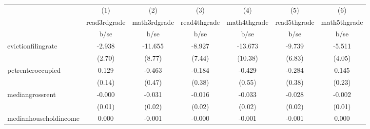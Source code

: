 {
\def\sym#1{\ifmmode^{#1}\else\(^{#1}\)\fi}
\begin{tabular}{l*{6}{c}}
\hline\hline
            &\multicolumn{1}{c}{(1)}           &\multicolumn{1}{c}{(2)}           &\multicolumn{1}{c}{(3)}           &\multicolumn{1}{c}{(4)}           &\multicolumn{1}{c}{(5)}           &\multicolumn{1}{c}{(6)}           \\
            &\multicolumn{1}{c}{read3rdgrade}  &\multicolumn{1}{c}{math3rdgrade}  &\multicolumn{1}{c}{read4thgrade}  &\multicolumn{1}{c}{math4thgrade}  &\multicolumn{1}{c}{read5thgrade}  &\multicolumn{1}{c}{math5thgrade}  \\
            &                     b/se         &                     b/se         &                     b/se         &                     b/se         &                     b/se         &                     b/se         \\
\hline
evictionfilingrate&                   -2.938         &                  -11.655         &                   -8.927         &                  -13.673         &                   -9.739         &                   -5.511         \\
            &                   (2.70)         &                   (8.77)         &                   (7.44)         &                  (10.38)         &                   (6.83)         &                   (4.05)         \\
pctrenteroccupied&                    0.129         &                   -0.463         &                   -0.184         &                   -0.429         &                   -0.284         &                    0.145         \\
            &                   (0.14)         &                   (0.47)         &                   (0.38)         &                   (0.55)         &                   (0.38)         &                   (0.23)         \\
mediangrossrent&                   -0.000         &                   -0.031         &                   -0.016         &                   -0.033         &                   -0.028         &                   -0.002         \\
            &                   (0.01)         &                   (0.02)         &                   (0.02)         &                   (0.02)         &                   (0.02)         &                   (0.01)         \\
medianhouseholdincome&                    0.000         &                   -0.001         &                   -0.000         &                   -0.001         &                   -0.001         &                    0.000         \\

\end{tabular}}
